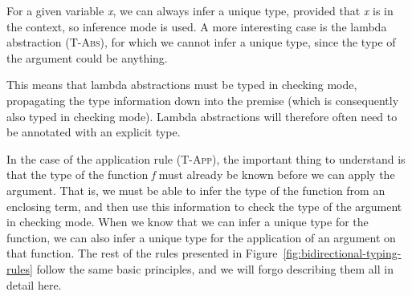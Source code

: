 \begin{figure}
\begin{center}
\usebox{\ptone}
\end{center}
\end{figure}
For a given variable \textit{x}, we can always infer a unique type, provided that \textit{x} is in the context, so inference mode is used. A more interesting case is the lambda abstraction (\textsc{T-Abs}), for which we cannot infer a unique type, since the type of the argument could be anything.
\begin{figure}
\begin{center}
\usebox{\pttwo}
\end{center}
\end{figure}
This means that lambda abstractions must be typed in checking mode, propagating the type information down into the premise (which is consequently also typed in checking mode). Lambda abstractions will therefore often need to be annotated with an explicit type. 
\begin{figure}
\begin{center}
\usebox{\ptthree}
\end{center}
\end{figure}
In the case of the application rule (\textsc{T-App}), the important thing to understand is that the type of the function \textit{f} must already be known before we can apply the argument. That is, we must be able to infer the type of the function from an enclosing term, and then use this information to check the type of the argument in checking mode. When we know that we can infer a unique type for the function, we can also infer a unique type for the application of an argument on that function. The rest of the rules presented in Figure~\ref{fig:bidirectional-typing-rules} follow the same basic principles, and we will forgo describing them all in detail here. 


\newsavebox{\ptPairElimOne}
\begin{lrbox}{\ptPairElimOne}
\begin{varwidth}{\linewidth}
\begin{prooftree}
\end{prooftree}
\end{varwidth}
\end{lrbox}

